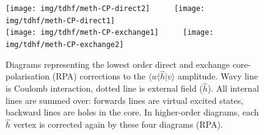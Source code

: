 \documentclass[10pt,twocolumn,a4paper]{article}%
\newcommand{\bra}[1]{\ensuremath{\langle #1|}}	%
\newcommand{\ket}[1]{\ensuremath{|#1\rangle}}
\begin{document}
\begin{figure}%
\centering
\texttt{[image: img/tdhf/meth-CP-direct2]}~~~~~
\texttt{[image: img/tdhf/meth-CP-direct1]}\\
\texttt{[image: img/tdhf/meth-CP-exchange1]}~~~~~
\texttt{[image: img/tdhf/meth-CP-exchange2]}
\caption{\small Diagrams representing the lowest order direct and exchange core-polarisation (RPA) corrections to the $\bra{w}\hat h\ket{v}$ amplitude.
Wavy line is Coulomb interaction, dotted line is external field ($\hat h$). All internal lines are summed over: forwards lines are virtual excited states, backward lines are holes in the core.
In higher-order diagrams, each $\hat h$ vertex is corrected again by these four diagrams (RPA).\label{fig:corePol}}
\end{figure}
\end{document}
